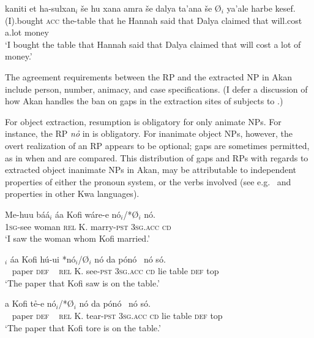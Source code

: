 \documentclass[output=paper]{LSP/langsci}
\begin{document}
\ex\label{ex:korsah:5b}
\gll *kaniti et ha-sulxan$_i$ \v se hu xana amra \v se dalya ta'ana \v se \O$_i$ ya'ale harbe kesef.\\
(I).bought \textsc{acc} the-table that he Hannah said that Dalya claimed that {} will.cost a.lot money \\
\glt  `I bought the table that Hannah said that Dalya claimed that will cost a lot of money.'
\z
\z

The agreement requirements between the RP and the extracted NP in Akan include person, number, animacy, and case specifications. (I defer a discussion of how Akan handles the ban on gaps in the extraction sites of subjects to .) 
 
For object extraction, resumption is  obligatory for only animate NPs.  For instance,  the RP \textit{n\h o} in  is obligatory. For inanimate object NPs, however, the overt realization of an RP appears to be optional; gaps are sometimes permitted, as in when  and  are compared. This distribution of gaps and RPs with regards to extracted object inanimate NPs in Akan, may be attributable to independent properties of either the pronoun system, or the verbs involved (see e.g.\ \citealt{Chinebuah76} and \citealt{Larson05}  properties in other Kwa languages).


\ea\label{ex:korsah:7} 
\gll  Me-huu \oor b{\'{a}}{\'{a}}$_i$  {\'{a}}a Kofi w{\'{a}}re-e n{\'{o}}$_i$/*\O $_i$ n{\'{o}}.\\
 \textsc{1sg}-see woman \textsc{rel} K. marry-\textsc{pst}  \textsc{3sg.acc} \textsc{cd} \\
\glt  `I saw the woman whom Kofi married.' \hfill  \citep[92]{Saah10}
\z


\ea\label{8} %
\ea\label{ex:korsah:8a}
\gll [ K{\'{r}}ata{\'{a}} n{\'{o}} ]$_i$ {\'{a}}a Kofi h{\'{u}}-ui *n{\'{o}}$_i$/\O $_i$ n{\'{o}} da p{\'{o}}n{\'{o}} \ n{\'{o}} s{\'{o}}.\\
 ~ paper  \textsc{def} ~  \textsc{rel} K. see-\textsc{pst} \textsc{3sg.acc} \textsc{cd} lie table \textsc{def} top \\
\glt  `The paper that Kofi saw is on the table.'

\ex\label{ex:korsah:8b}
a Kofi t\h e-e n{\'{o}}$_i$/*\O $_i$ n{\'{o}} da p{\'{o}}n{\'{o}} \ n{\'{o}} s{\'{o}}.\\
~ paper \textsc{def} ~ \textsc{rel} K. tear-\textsc{pst}  \textsc{3sg.acc} \textsc{cd} lie table \textsc{def} top \\
\glt  `The paper that Kofi tore is on the table.'
\end{document}
